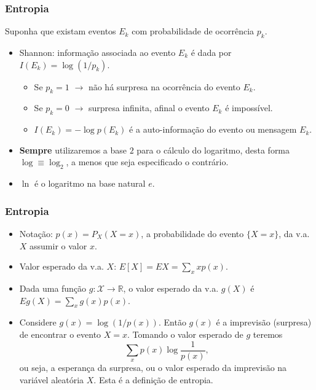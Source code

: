 \begin{frame}%
  \frametitle{Entropia}
  Suponha que existam eventos $E_k$ com probabilidade de ocorrência $p_k$. 

  \begin{itemize}
  \item Shannon: informação associada ao evento $E_k$ é dada por $I(E_k) = \log (1/p_k)$.
        \begin{itemize}
        \item Se $p_k=1$ $\rightarrow$ não há surpresa na ocorrência do evento $E_k$.
        \item Se $p_k=0$ $\rightarrow$ surpresa infinita, afinal o evento $E_k$ é impossível.
        \item $I(E_k) = - \log p(E_k)$ é a auto-informação do evento ou mensagem $E_k$.
        \end{itemize}
  \item \textbf{Sempre} utilizaremos a base $2$ para o cálculo do logaritmo, desta forma
  $\log \equiv \log_2$, a menos que seja especificado o contrário.
  \item $\ln$ é o logaritmo na base natural $e$.
  \end{itemize}
\end{frame}

\begin{frame}%
  \frametitle{Entropia}
  \begin{itemize}
  \item Notação: $p(x) = P_X(X=x)$, a probabilidade do evento $\{X=x\}$, da v.a. $X$ assumir o valor $x$.
  \item Valor esperado da v.a. $X$: $E[X] = EX = \sum_x x p(x)$.
  \item Dada uma função $g: \mathcal{X} \rightarrow \mathbb{R}$, o valor esperado da
  v.a. $g(X)$ é $E g(X) = \sum_x g(x) p(x)$.
  \item Considere $g(x) = \log(1/p(x))$. Então $g(x)$ é a imprevisão (surpresa) de encontrar o evento $X=x$.
        Tomando o valor esperado de $g$ teremos
        \begin{equation}
        \sum_x p(x) \log \frac{1}{p(x)} ,
        \end{equation}
        ou seja, a esperança da surpresa, ou o valor esperado da imprevisão na variável aleatória $X$.
        Esta é a definição de entropia.
  \end{itemize}
\end{frame}

